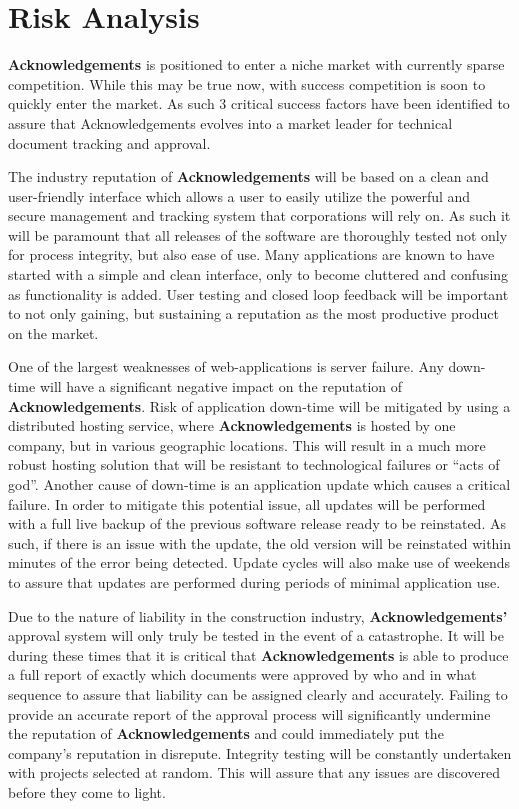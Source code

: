 \section{Risk Analysis}

{\bf Acknowledgements} is positioned to enter a niche market with currently sparse competition. While this may be true now, with success competition is soon to quickly enter the market. As such 3 critical success factors have been identified to assure that Acknowledgements evolves into a market leader for technical document tracking and approval.

The industry reputation of {\bf Acknowledgements} will be based on a clean and user-friendly interface which allows a user to easily utilize the powerful and secure management and tracking system that corporations will rely on. As such it will be paramount that all releases of the software are thoroughly tested not only for process integrity, but also ease of use. Many applications are known to have started with a simple and clean interface, only to become cluttered and confusing as functionality is added. User testing and closed loop feedback will be important to not only gaining, but sustaining a reputation as the most productive product on the market.

One of the largest weaknesses of web-applications is server failure. Any down-time will have a significant negative impact on the reputation of {\bf Acknowledgements}. Risk of application down-time will be mitigated by using a distributed hosting service, where {\bf Acknowledgements} is hosted by one company, but in various geographic locations. This will result in a much more robust hosting solution that will be resistant to technological failures or ``acts of god''. Another cause of down-time is an application update which causes a critical failure. In order to mitigate this potential issue, all updates will be performed with a full live backup of the previous software release ready to be reinstated. As such, if there is an issue with the update, the old version will be reinstated within minutes of the error being detected. Update cycles will also make use of weekends to assure that updates are performed during periods of minimal application use.

Due to the nature of liability in the construction industry, {\bf Acknowledgements'} approval system will only truly be tested in the event of a catastrophe. It will be during these times that it is critical that {\bf Acknowledgements} is able to produce a full report of exactly which documents were approved by who and in what sequence to assure that liability can be assigned clearly and accurately. Failing to provide an accurate report of the approval process will significantly undermine the reputation of {\bf Acknowledgements} and could immediately put the company's reputation in disrepute. Integrity testing will be constantly undertaken with projects selected at random. This will assure that any issues are discovered before they come to light.

